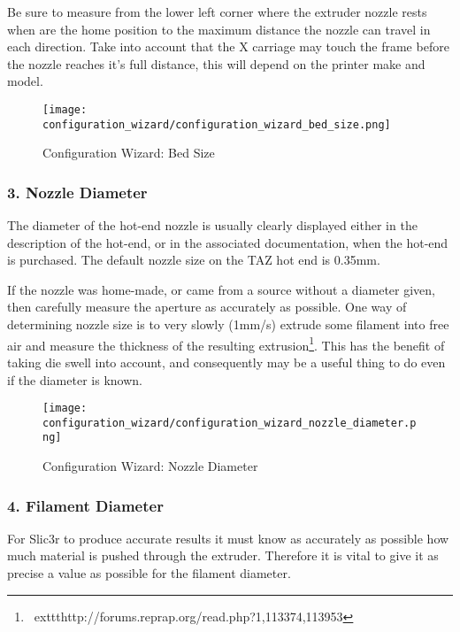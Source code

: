 Be sure to measure from the lower left corner where the extruder nozzle rests when are the home position to the maximum distance the nozzle can travel in each direction.  Take into account that the X carriage may touch the frame before the nozzle reaches it's full distance, this will depend on the printer make and model.

\begin{figure}[H]
\centering
\texttt{[image: configuration\_wizard/configuration\_wizard\_bed\_size.png]}
\caption{Configuration Wizard: Bed Size}
\label{fig:configuration_wizard_bed_size}
\end{figure}

\newpage
\subsubsection{3. Nozzle Diameter}
\label{sub:3_nozzle_diameter}
The diameter of the hot-end nozzle is usually clearly displayed either in the description of the hot-end, or in the associated documentation, when the hot-end is purchased.  The default nozzle size on the TAZ hot end is 0.35mm.

If the nozzle was home-made, or came from a source without a diameter given, then carefully measure the aperture as accurately as possible.  One way of determining nozzle size is to very slowly (1mm/s) extrude some filament into free air and measure the thickness of the resulting extrusion\footnote{\	exttt{http://forums.reprap.org/read.php?1,113374,113953}}.  This has the benefit of taking die swell into account, and consequently may be a useful thing to do even if the diameter is known.

\begin{figure}[H]
\centering
\texttt{[image: configuration\_wizard/configuration\_wizard\_nozzle\_diameter.png]}
\caption{Configuration Wizard: Nozzle Diameter}
\label{fig:configuration_wizard_nozzle_diameter}
\end{figure}

\newpage
\subsubsection{4. Filament Diameter}
\label{sub:4_filament_diameter}
For Slic3r to produce accurate results it must know as accurately as possible how much material is pushed through the extruder.  Therefore it is vital to give it as precise a value as possible for the filament diameter.


